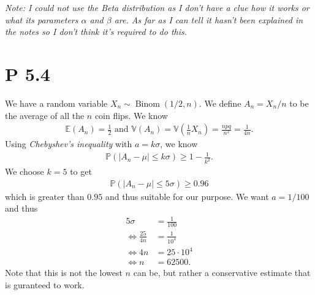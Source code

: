 \documentclass{article}
\renewcommand{\P}{\mathbb{P}}
\newcommand{\E}{\mathbb{E}}
\newcommand{\V}{\mathbb{V}}
\DeclareMathOperator{\Binom}{Binom}
\begin{document}
\emph{Note: I could not use the Beta distribution as I don't have
a clue how it works or what its parameters $\alpha$ and $\beta$ are.
As far as I can tell it hasn't been explained in the notes so I don't
think it's required to do this.}
\section*{P 5.4}
We have a random variable $X_n\sim\Binom(1/2,n)$. We define
$A_n = X_n / n$ to be the average of all the $n$ coin flips. 
We know
\begin{align*}
  \E(A_n) = \frac{1}{2} \text{ and } 
  \V(A_n) = \V\left(\frac{1}{n}X_n\right) = \frac{npq}{n^2} = \frac{1}{4n}.
\end{align*}
Using \emph{Chebyshev's inequality} with $a=k\sigma$, we know
\begin{align*}
  \P(|A_n - \mu| \leq k\sigma) \geq 1 - \frac{1}{k^2}.
\end{align*}
We choose $k=5$ to get
\begin{align*}
  \P(|A_n - \mu| \leq 5\sigma) \geq 0.96
\end{align*}
which is greater than $0.95$ and thus suitable for our purpose.
We want $a=1/100$ and thus
\begin{align*}
  5\sigma &= \frac{1}{100}\\
  \Leftrightarrow \frac{25}{4n} &= \frac{1}{10^4}\\
  \Leftrightarrow 4n &= 25\cdot 10^4\\
  \Leftrightarrow n &= 62500.
\end{align*}
Note that this is not the lowest $n$ can be, but rather a conservative
estimate that is guranteed to work.
\end{document}
